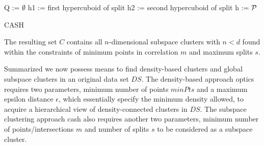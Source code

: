 \begin{algorithm}
\SetAlgoLined
{}
Q := $\emptyset$\;     
h1 := first hypercuboid of split\;
h2 := second hypercuboid of split\;
h := $\mathcal{P}$

 \caption{CASH}
\end{algorithm}

The resulting set $C$ contains all $n$-dimensional subspace clusters with $n < d$ found within the constraints of minimum points in correlation $m$ and maximum splits $s$.

Summarized we now possess means to find density-based clusters and global subspace clusters in an original data set $DS$. The density-based approach \gls{optics} requires two parameters, minimum number of points $minPts$ and a maximum epsilon distance $\epsilon$, which essentially specify the minimum density allowed, to acquire a hierarchical view of density-connected clusters in $DS$. The subspace clustering approach \gls{cash} also requires another two parameters, minimum number of points/intersections $m$ and number of splits $s$ to be considered as a subspace cluster.

